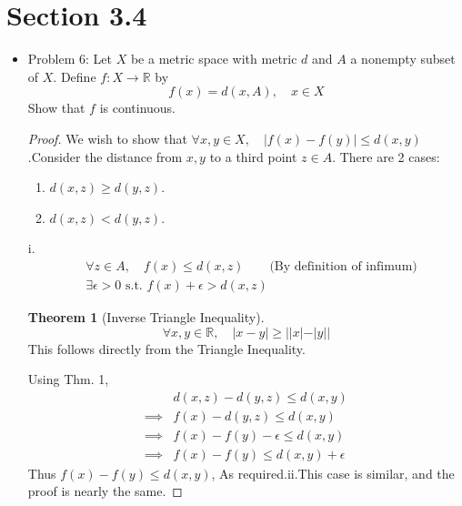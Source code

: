 \documentclass[hidelinks,12pt]{article}
\title{\scalebox{2}{Math 551 Homework 4}}
\author{\scalebox{1.5}{Theo Koss}}
\date{November 2021}
\theoremstyle{definition}
\newtheorem{theorem}{Theorem}
\newcommand{\R}{\mathbb{R}}
\begin{document}
\maketitle
\section{Section 3.4}
\begin{itemize}
    \item Problem 6: Let $X$ be a metric space with metric $d$ and $A$ a nonempty subset of $X$. Define $f:X\to\R$ by $$f(x)=d(x,A),\quad x\in X$$ Show that $f$ is continuous.\begin{proof}We wish to show that $\forall x,y\in X,\quad |f(x)-f(y)|\leq d(x,y)$.\newline Consider the distance from $x,y$ to a third point $z\in A$. There are 2 cases:\begin{enumerate}[label=\roman*.]
        \item $d(x,z)\geq d(y,z)$.
        \item $d(x,z)<d(y,z)$.
    \end{enumerate}
    i.\begin{align*}
        &\forall z\in A,\quad f(x)\leq d(x,z)\qquad\text{(By definition of infimum)}\\
        &\exists\epsilon>0\text{ s.t. }f(x)+\epsilon>d(x,z)
    \end{align*}
    \begin{theorem}[Inverse Triangle Inequality]$$\forall x,y\in\R,\quad |x-y|\geq||x|-|y||$$ This follows directly from the Triangle Inequality.
    \end{theorem}
    Using Thm. 1, \begin{align*}
        &d(x,z)-d(y,z)\leq d(x,y)\\
        \implies &f(x)-d(y,z)\leq d(x,y) \\
        \implies &f(x)-f(y)-\epsilon\leq d(x,y)\\
        \implies &f(x)-f(y)\leq d(x,y)+\epsilon
    \end{align*}
    Thus $f(x)-f(y)\leq d(x,y)$, As required.\newline ii.\newline   This case is similar, and the proof is nearly the same.
    \end{proof}
\end{itemize}
\end{document}
